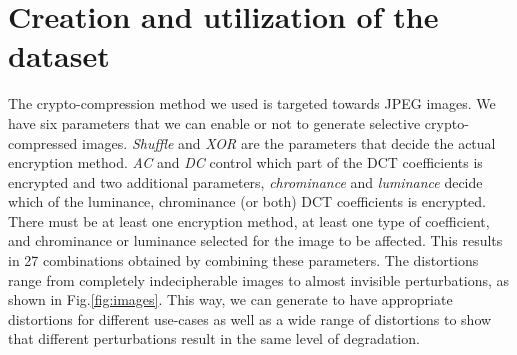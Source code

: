 \documentclass{article}
\begin{document}
\section{Creation and utilization of the dataset}
\label{sec:dataset}
The crypto-compression method we used is targeted towards JPEG images. We have six parameters that we can enable or not to generate selective crypto-compressed images. \textit{Shuffle} and \textit{XOR} are the parameters that decide the actual encryption method. \textit{AC} and \textit{DC} control which part of the DCT coefficients is encrypted and two additional parameters, \textit{chrominance} and \textit{luminance} decide which of the luminance, chrominance (or both) DCT coefficients is encrypted. There must be at least one encryption method, at least one type of coefficient, and chrominance or luminance selected for the image to be affected. This results in 27 combinations obtained by combining these parameters. The distortions range from completely indecipherable images to almost invisible perturbations, as shown in Fig.\ref{fig:images}. This way, we can generate to have appropriate distortions for different use-cases as well as a wide range of distortions to show that different perturbations result in the same level of degradation.
\end{document}
